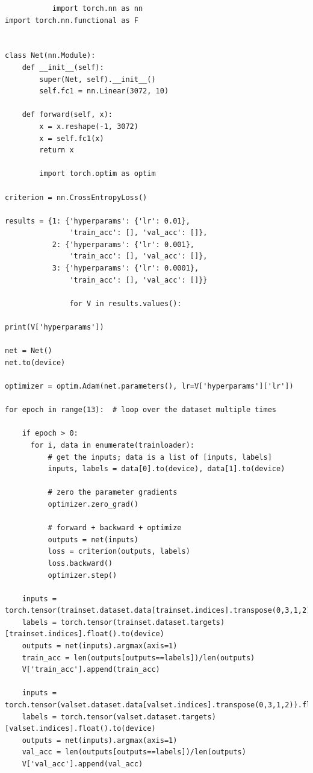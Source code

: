 \documentclass{article}
\begin{document}
\begin{enumerate}
\begin{verbatim}
           import torch.nn as nn
import torch.nn.functional as F


class Net(nn.Module):
    def __init__(self):
        super(Net, self).__init__()
        self.fc1 = nn.Linear(3072, 10)

    def forward(self, x):
        x = x.reshape(-1, 3072)
        x = self.fc1(x)
        return x

        import torch.optim as optim

criterion = nn.CrossEntropyLoss()

results = {1: {'hyperparams': {'lr': 0.01},
               'train_acc': [], 'val_acc': []},
           2: {'hyperparams': {'lr': 0.001},
               'train_acc': [], 'val_acc': []},
           3: {'hyperparams': {'lr': 0.0001},
               'train_acc': [], 'val_acc': []}}

               for V in results.values():

print(V['hyperparams'])

net = Net()
net.to(device)

optimizer = optim.Adam(net.parameters(), lr=V['hyperparams']['lr'])

for epoch in range(13):  # loop over the dataset multiple times

    if epoch > 0:
      for i, data in enumerate(trainloader):
          # get the inputs; data is a list of [inputs, labels]
          inputs, labels = data[0].to(device), data[1].to(device)
          
          # zero the parameter gradients
          optimizer.zero_grad()

          # forward + backward + optimize
          outputs = net(inputs)
          loss = criterion(outputs, labels)
          loss.backward()
          optimizer.step()

    inputs = torch.tensor(trainset.dataset.data[trainset.indices].transpose(0,3,1,2)).float().to(device)
    labels = torch.tensor(trainset.dataset.targets)[trainset.indices].float().to(device)
    outputs = net(inputs).argmax(axis=1)
    train_acc = len(outputs[outputs==labels])/len(outputs)
    V['train_acc'].append(train_acc)

    inputs = torch.tensor(valset.dataset.data[valset.indices].transpose(0,3,1,2)).float().to(device)
    labels = torch.tensor(valset.dataset.targets)[valset.indices].float().to(device)
    outputs = net(inputs).argmax(axis=1)
    val_acc = len(outputs[outputs==labels])/len(outputs)
    V['val_acc'].append(val_acc)


\end{verbatim}
\end{enumerate}
\end{document}
